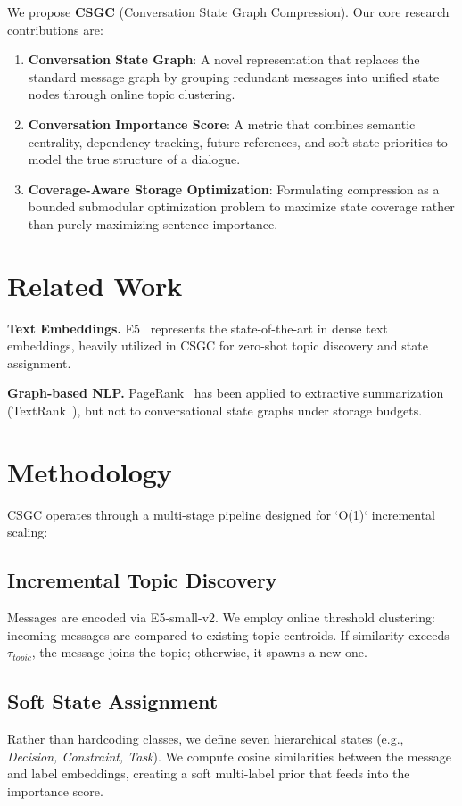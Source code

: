 \documentclass[10pt,twocolumn,letterpaper]{article}
\begin{document}
We propose \textbf{CSGC} (Conversation State Graph Compression). Our core research contributions are:
\begin{enumerate}
    \item \textbf{Conversation State Graph}: A novel representation that replaces the standard message graph by grouping redundant messages into unified state nodes through online topic clustering.
    \item \textbf{Conversation Importance Score}: A metric that combines semantic centrality, dependency tracking, future references, and soft state-priorities to model the true structure of a dialogue.
    \item \textbf{Coverage-Aware Storage Optimization}: Formulating compression as a bounded submodular optimization problem to maximize state coverage rather than purely maximizing sentence importance.
\end{enumerate}

\section{Related Work}

\textbf{Text Embeddings.} E5~\cite{wang2022e5} represents the state-of-the-art in dense text embeddings, heavily utilized in CSGC for zero-shot topic discovery and state assignment.

\textbf{Graph-based NLP.} PageRank~\cite{page1999pagerank} has been applied to extractive summarization (TextRank~\cite{mihalcea2004textrank}), but not to conversational state graphs under storage budgets.

\section{Methodology}

CSGC operates through a multi-stage pipeline designed for `O(1)` incremental scaling:

\subsection{Incremental Topic Discovery}
Messages are encoded via E5-small-v2. We employ online threshold clustering: incoming messages are compared to existing topic centroids. If similarity exceeds $\tau_{topic}$, the message joins the topic; otherwise, it spawns a new one.

\subsection{Soft State Assignment}
Rather than hardcoding classes, we define seven hierarchical states (e.g., \textit{Decision, Constraint, Task}). We compute cosine similarities between the message and label embeddings, creating a soft multi-label prior that feeds into the importance score.
\end{document}
